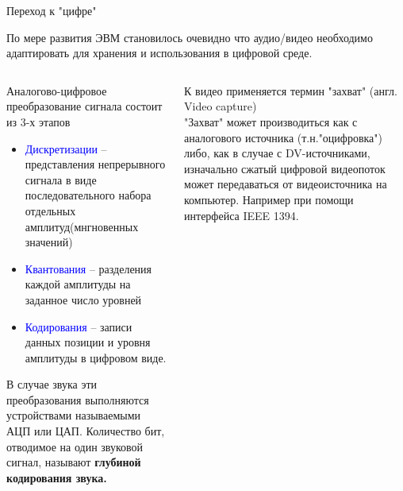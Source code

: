 \documentclass[aspectratio=169]{beamer}
\newcommand{\blu}{\textcolor{blue}}
\newcommand{\n}{\normalsize}
\begin{document}
\begin{frame}{Переход к "цифре"}

    \footnotesize По мере развития ЭВМ становилось очевидно что аудио/видео необходимо адаптировать для хранения и использования в цифровой среде.
    \begin{columns}
\begin{column}[t]{6.9cm}
\alert{Аналогово-цифровое преобразование сигнала состоит из 3-х этапов}
\begin{itemize}
    \item \blu{Дискретизации} – \scriptsize представления непрерывного сигнала в виде последовательного набора отдельных амплитуд(мнгновенных значений)
    \item \n \blu{Квантования} – \scriptsize разделения каждой амплитуды на заданное число уровней
    \item \n \blu{Кодирования} – \scriptsize записи данных позиции и уровня амплитуды в цифровом виде.
\end{itemize}
В случае звука эти преобразования выполняются устройствами называемыми АЦП или ЦАП. Количество бит, отводимое на один звуковой сигнал, называют \textbf{ глубиной кодирования звука.}
\end{column}
\begin{column}[t]{7cm}
\alert{К видео применяется термин "захват" (англ. Video capture)}\\
"Захват" может производиться как с аналогового источника (т.н."оцифровка") либо, как в случае с DV-источниками, изначально сжатый цифровой видеопоток может передаваться от видеоисточника на компьютер. Например при помощи интерфейса IEEE 1394.
 \begin{figure}[h]
  \begin{minipage}[h]{0.47\linewidth}
  \end{minipage}
  \begin{minipage}[h]{0.47\linewidth}
  \vspace{-2ex}
  \end{minipage}
 \end{figure}
\end{column}
\end{columns}
\end{frame}
\end{document}
